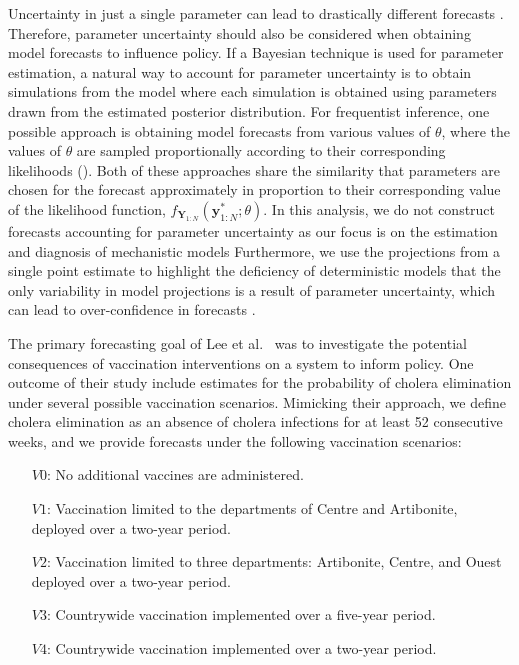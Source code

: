 \documentclass[10pt,letterpaper]{article}\usepackage[]{graphicx}\usepackage[table]{xcolor}
\newcommand\paramVec{\theta}
\begin{document}
Uncertainty in just a single parameter can lead to drastically different forecasts \cite{saltelli20}.
Therefore, parameter uncertainty should also be considered when obtaining model forecasts to influence policy.
If a Bayesian technique is used for parameter estimation, a natural way to account for parameter uncertainty is to obtain simulations from the model where each simulation is obtained using parameters drawn from the estimated posterior distribution.
For frequentist inference, one possible approach is obtaining model forecasts from various values of $\paramVec$, where the values of $\paramVec$ are sampled proportionally according to their corresponding likelihoods \cite{king15} ().
Both of these approaches share the similarity that parameters are chosen for the forecast approximately in proportion to their corresponding value of the likelihood function, $f_{\bm{Y}_{1:N}}(\bm{y}_{1:N}^*; \paramVec)$.
In this analysis, we do not construct forecasts accounting for parameter uncertainty as our focus is on the estimation and diagnosis of mechanistic models
Furthermore, we use the projections from a single point estimate to highlight the deficiency of deterministic models that the only variability in model projections is a result of parameter  uncertainty, which can lead to over-confidence in forecasts \cite{king15}.

The primary forecasting goal of Lee et al.~\cite{lee20} was to investigate the potential consequences of vaccination interventions on a system to inform policy.
One outcome of their study include estimates for the probability of cholera elimination under several possible vaccination scenarios.
Mimicking their approach, we define cholera elimination as an absence of cholera infections for at least 52 consecutive weeks, and we provide forecasts under the following vaccination scenarios:

\begin{itemize}
  \item[$V0$:] No additional vaccines are administered.
  \item[$V1$:] Vaccination limited to the departments of Centre and Artibonite, deployed over a two-year period.
  \item[$V2$:] Vaccination limited to three departments: Artibonite, Centre, and Ouest deployed over a two-year period.
  \item[$V3$:] Countrywide vaccination implemented over a five-year period.
  \item[$V4$:] Countrywide vaccination implemented over a two-year period.
\end{itemize}
\end{document}
